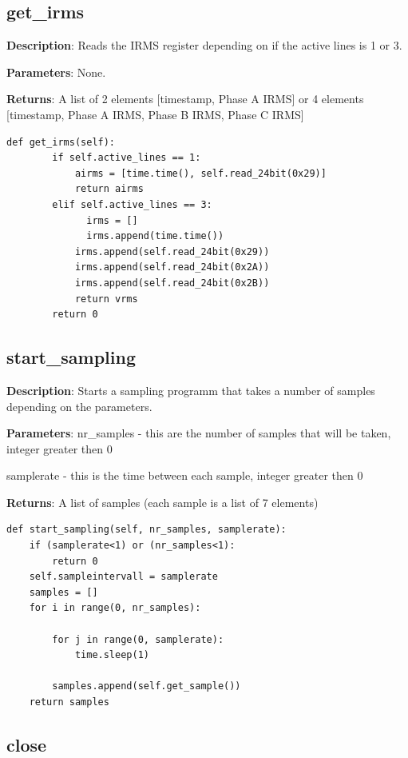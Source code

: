 \documentclass{scrartcl}  %
\begin{document}
\subsection{get_irms}

\textbf{Description}: Reads the IRMS register depending on if the active lines is 1 or 3.

\textbf{Parameters}: None.

\textbf{Returns}: A list of 2 elements [timestamp, Phase A IRMS] or 4 elements [timestamp, Phase A IRMS, Phase B IRMS, Phase C IRMS]

\begin{lstlisting}
def get_irms(self):
    	if self.active_lines == 1:
    		airms = [time.time(), self.read_24bit(0x29)]
    		return airms
    	elif self.active_lines == 3:
              irms = []
              irms.append(time.time())
    		irms.append(self.read_24bit(0x29))
    		irms.append(self.read_24bit(0x2A))
    		irms.append(self.read_24bit(0x2B))
    		return vrms
    	return 0
\end{lstlisting}
		
\subsection{start_sampling}	

\textbf{Description}: Starts a sampling programm that takes a number of samples depending on the parameters.

\textbf{Parameters}: nr_samples - this are the number of samples that will be taken, integer greater then 0

					samplerate - this is the time between each sample, integer greater then 0

\textbf{Returns}: A list of samples (each sample is a list of 7 elements)
\begin{lstlisting}
def start_sampling(self, nr_samples, samplerate):
	if (samplerate<1) or (nr_samples<1):
		return 0
	self.sampleintervall = samplerate
	samples = []
	for i in range(0, nr_samples):
            
		for j in range(0, samplerate):
			time.sleep(1)
                
		samples.append(self.get_sample())     
	return samples
\end{lstlisting}
    
\subsection{close}
\end{document}
